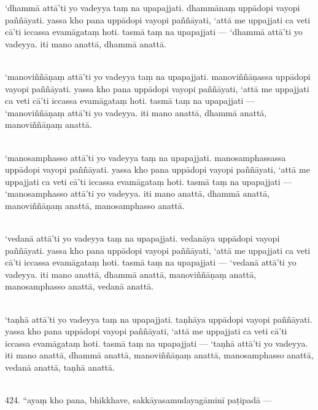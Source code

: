 \documentclass[9pt]{article}
\begin{document}
‘dhammā attā’ti yo vadeyya taṃ na upapajjati. dhammānaṃ uppādopi vayopi paññāyati. yassa kho pana uppādopi vayopi paññāyati, ‘attā me uppajjati ca veti cā’ti iccassa evamāgataṃ hoti. tasmā taṃ na upapajjati — ‘dhammā attā’ti yo vadeyya. iti mano anattā, dhammā anattā.\\\

‘manoviññāṇaṃ attā’ti yo vadeyya taṃ na upapajjati. manoviññāṇassa uppādopi vayopi paññāyati. yassa kho pana uppādopi vayopi paññāyati, ‘attā me uppajjati ca veti cā’ti iccassa evamāgataṃ hoti. tasmā taṃ na upapajjati — ‘manoviññāṇaṃ attā’ti yo vadeyya. iti mano anattā, dhammā anattā, manoviññāṇaṃ anattā.\\\

‘manosamphasso attā’ti yo vadeyya taṃ na upapajjati. manosamphassassa uppādopi vayopi paññāyati. yassa kho pana uppādopi vayopi paññāyati, ‘attā me uppajjati ca veti cā’ti iccassa evamāgataṃ hoti. tasmā taṃ na upapajjati — ‘manosamphasso attā’ti yo vadeyya. iti mano anattā, dhammā anattā, manoviññāṇaṃ anattā, manosamphasso anattā.\\\

‘vedanā attā’ti yo vadeyya taṃ na upapajjati. vedanāya uppādopi vayopi paññāyati. yassa kho pana uppādopi vayopi paññāyati, ‘attā me uppajjati ca veti cā’ti iccassa evamāgataṃ hoti. tasmā taṃ na upapajjati — ‘vedanā attā’ti yo vadeyya. iti mano anattā, dhammā anattā, manoviññāṇaṃ anattā, manosamphasso anattā, vedanā anattā.\\\

‘taṇhā attā’ti yo vadeyya taṃ na upapajjati. taṇhāya uppādopi vayopi paññāyati. yassa kho pana uppādopi vayopi paññāyati, ‘attā me uppajjati ca veti cā’ti iccassa evamāgataṃ hoti. tasmā taṃ na upapajjati — ‘taṇhā attā’ti yo vadeyya. iti mano anattā, dhammā anattā, manoviññāṇaṃ anattā, manosamphasso anattā, vedanā anattā, taṇhā anattā.\\\

424. “ayaṃ kho pana, bhikkhave, sakkāyasamudayagāminī paṭipadā —\\\
\end{document}

